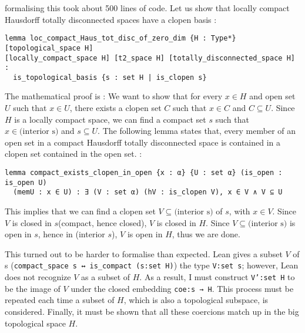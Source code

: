 \documentclass[a4paper,UKenglish,cleveref, autoref, thm-restate]{lipics-v2021}
\newcommand{\lean}[1]{\texttt{#1}\xspace} %
\begin{document}
formalising this took about 500 lines of code. Let us show that locally compact Hausdorff
totally disconnected spaces have a clopen basis :

\begin{lstlisting}
lemma loc_compact_Haus_tot_disc_of_zero_dim {H : Type*} [topological_space H] 
[locally_compact_space H] [t2_space H] [totally_disconnected_space H] :
  is_topological_basis {s : set H | is_clopen s}
\end{lstlisting}

The mathematical proof is : We want to show that for every $x \in H$ and open set $U$ such that
$x \in U$, there exists a clopen set $C$ such that $x \in C$ and $C \subseteq U$. Since $H$ is a
locally compact space, we can find a compact set $s$ such that $x \in \text{(interior s)}$ and
$s \subseteq U$. The following lemma states that, every member of an open set in a compact Hausdorff 
totally disconnected space is contained in a clopen set contained in the open set. :
\begin{lstlisting}
lemma compact_exists_clopen_in_open {x : α} {U : set α} (is_open : is_open U) 
  (memU : x ∈ U) : ∃ (V : set α) (hV : is_clopen V), x ∈ V ∧ V ⊆ U
\end{lstlisting}
This implies that we can find a clopen set $V \subseteq \text{(interior s)}$ of $s$, with $x \in V$. 
Since $V$ is closed in $s$(compact, hence closed), $V$ is closed in $H$. Since
$V \subseteq \text{(interior s)}$ is open in $s$, hence in (interior $s$), $V$ is open in $H$, thus
we are done. 

This turned out to be harder to formalise than expected. Lean gives a subset $V$ of s \newline (\lean{compact\_space s ↔ is\_compact (s:set H)}) 
the type \lean{V:set s}; however, Lean does not recognize $V$ as a subset of $H$. As a result, I must construct \lean{V':set H} 
to be the image of $V$ under the closed embedding \lean{coe:s → H}. This process must be repeated each time a subset of $H$, 
which is also a topological subspace, is considered. Finally, it must be shown that all these coercions match up in the big 
topological space $H$.

\end{document}
